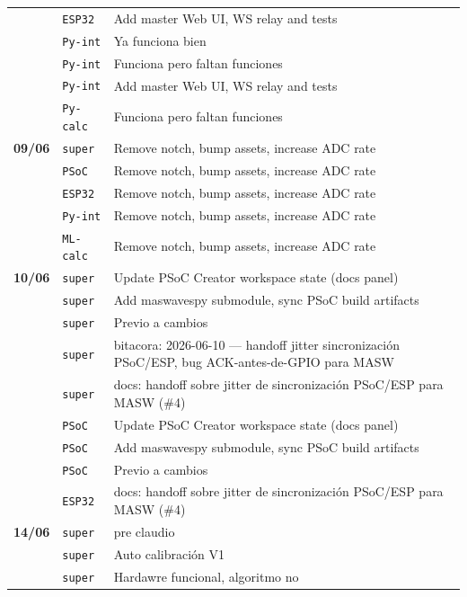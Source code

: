 \begin{longtable}{@{}p{1.7cm} p{1.5cm} p{12.2cm}@{}}
 & \texttt{\scriptsize ESP32} & Add master Web UI, WS relay and tests \\
 & \texttt{\scriptsize Py-int} & Ya funciona bien \\
 & \texttt{\scriptsize Py-int} & Funciona pero faltan funciones \\
 & \texttt{\scriptsize Py-int} & Add master Web UI, WS relay and tests \\
 & \texttt{\scriptsize Py-calc} & Funciona pero faltan funciones \\
\textbf{09/06} & \texttt{\scriptsize super} & Remove notch, bump assets, increase ADC rate \\
 & \texttt{\scriptsize PSoC} & Remove notch, bump assets, increase ADC rate \\
 & \texttt{\scriptsize ESP32} & Remove notch, bump assets, increase ADC rate \\
 & \texttt{\scriptsize Py-int} & Remove notch, bump assets, increase ADC rate \\
 & \texttt{\scriptsize ML-calc} & Remove notch, bump assets, increase ADC rate \\
\textbf{10/06} & \texttt{\scriptsize super} & Update PSoC Creator workspace state (docs panel) \\
 & \texttt{\scriptsize super} & Add maswavespy submodule, sync PSoC build artifacts \\
 & \texttt{\scriptsize super} & Previo a cambios \\
 & \texttt{\scriptsize super} & bitacora: 2026-06-10 --- handoff jitter sincronización PSoC/ESP, bug ACK-antes-de-GPIO para MASW \\
 & \texttt{\scriptsize super} & docs: handoff sobre jitter de sincronización PSoC/ESP para MASW (\#4) \\
 & \texttt{\scriptsize PSoC} & Update PSoC Creator workspace state (docs panel) \\
 & \texttt{\scriptsize PSoC} & Add maswavespy submodule, sync PSoC build artifacts \\
 & \texttt{\scriptsize PSoC} & Previo a cambios \\
 & \texttt{\scriptsize ESP32} & docs: handoff sobre jitter de sincronización PSoC/ESP para MASW (\#4) \\
\textbf{14/06} & \texttt{\scriptsize super} & pre claudio \\
 & \texttt{\scriptsize super} & Auto calibración V1 \\
 & \texttt{\scriptsize super} & Hardawre funcional, algoritmo no \\

\end{longtable}
